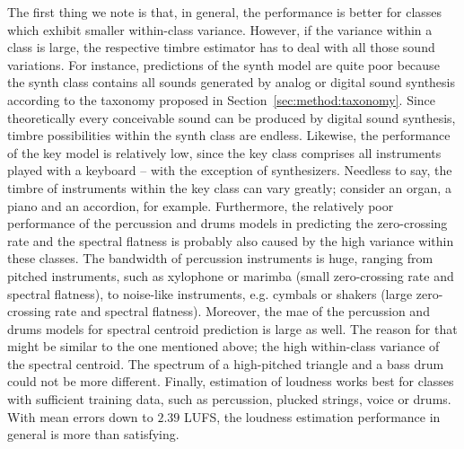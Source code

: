 The first thing we note is that, in general, the performance is better for classes which exhibit smaller within-class variance. However, if the variance within a class is large, the respective timbre estimator has to deal with all those sound variations. For instance, predictions of the synth model are quite poor because the synth class contains all sounds generated by analog or digital sound synthesis according to the taxonomy proposed in Section~\ref{sec:method:taxonomy}. Since theoretically every conceivable sound can be produced by digital sound synthesis, timbre possibilities within the synth class are endless. Likewise, the performance of the key model is relatively low, since the key class comprises all instruments played with a keyboard -- with the exception of synthesizers. Needless to say, the timbre of instruments within the key class can vary greatly; consider an organ, a piano and an accordion, for example. Furthermore, the relatively poor performance of the percussion and drums models in predicting the zero-crossing rate and the spectral flatness is probably also caused by the high variance within these classes. The bandwidth of percussion instruments is huge, ranging from pitched instruments, such as xylophone or marimba (small zero-crossing rate and spectral flatness), to noise-like instruments, e.g. cymbals or shakers (large zero-crossing rate and spectral flatness). Moreover, the \gls{mae} of the percussion and drums models for spectral centroid prediction is large as well. The reason for that might be similar to the one mentioned above; the high within-class variance of the spectral centroid. The spectrum of a high-pitched triangle and a bass drum could not be more different. Finally, estimation of loudness works best for classes with sufficient training data, such as percussion, plucked strings, voice or drums. With mean errors down to $2.39$ LUFS, the loudness estimation performance in general is more than satisfying.
